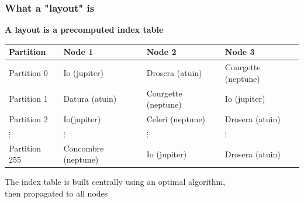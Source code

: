 \documentclass[aspectratio=169]{beamer}
\begin{document}
\begin{frame}
	\frametitle{What a "layout" is}
	\textbf{A layout is a precomputed index table}
	\vspace{2em}

		\begin{center}
		\begin{tabular}{|l|l|l|l|}
			\hline
			\textbf{Partition} & \textbf{Node 1} & \textbf{Node 2} & \textbf{Node 3} \\
			\hline
			\hline
			Partition 0 & Io (jupiter) & Drosera (atuin) & Courgette (neptune) \\
			\hline
			Partition 1 & Datura (atuin) & Courgette (neptune) & Io (jupiter) \\
			\hline
			Partition 2 & Io(jupiter) & Celeri (neptune) & Drosera (atuin) \\
			\hline
			\hspace{1em}$\vdots$ & \hspace{1em}$\vdots$ & \hspace{1em}$\vdots$ & \hspace{1em}$\vdots$ \\
			\hline
			Partition 255 & Concombre (neptune) & Io (jupiter) & Drosera (atuin) \\
			\hline
		\end{tabular}
		\end{center}

	\vspace{1em}
		The index table is built centrally using an optimal algorithm,\\
		then propagated to all nodes
\end{frame}
\end{document}
